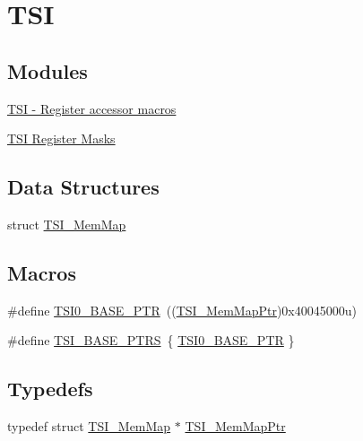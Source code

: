 \hypertarget{group___t_s_i___peripheral}{}\section{T\+S\+I}
\label{group___t_s_i___peripheral}
\subsection*{Modules}
\begin{DoxyCompactItemize}
\item 
\hyperlink{group___t_s_i___register___accessor___macros}{T\+S\+I -\/ Register accessor macros}
\item 
\hyperlink{group___t_s_i___register___masks}{T\+S\+I Register Masks}
\end{DoxyCompactItemize}
\subsection*{Data Structures}
\begin{DoxyCompactItemize}
\item 
struct \hyperlink{struct_t_s_i___mem_map}{T\+S\+I\+\_\+\+Mem\+Map}
\end{DoxyCompactItemize}
\subsection*{Macros}
\begin{DoxyCompactItemize}
\item 
\#define \hyperlink{group___t_s_i___peripheral_gaf98ea1cd15559446e0cfc1ae177751f6}{T\+S\+I0\+\_\+\+B\+A\+S\+E\+\_\+\+P\+T\+R}~((\hyperlink{group___t_s_i___peripheral_gad1310fedc6b594554cdd760e371de570}{T\+S\+I\+\_\+\+Mem\+Map\+Ptr})0x40045000u)
\item 
\#define \hyperlink{group___t_s_i___peripheral_gaf0e643a8dc882d5a89dd6bb9a4ca3d16}{T\+S\+I\+\_\+\+B\+A\+S\+E\+\_\+\+P\+T\+R\+S}~\{ \hyperlink{group___t_s_i___peripheral_gaf98ea1cd15559446e0cfc1ae177751f6}{T\+S\+I0\+\_\+\+B\+A\+S\+E\+\_\+\+P\+T\+R} \}
\end{DoxyCompactItemize}
\subsection*{Typedefs}
\begin{DoxyCompactItemize}
\item 
typedef struct \hyperlink{struct_t_s_i___mem_map}{T\+S\+I\+\_\+\+Mem\+Map} $\ast$ \hyperlink{group___t_s_i___peripheral_gad1310fedc6b594554cdd760e371de570}{T\+S\+I\+\_\+\+Mem\+Map\+Ptr}
\end{DoxyCompactItemize}


